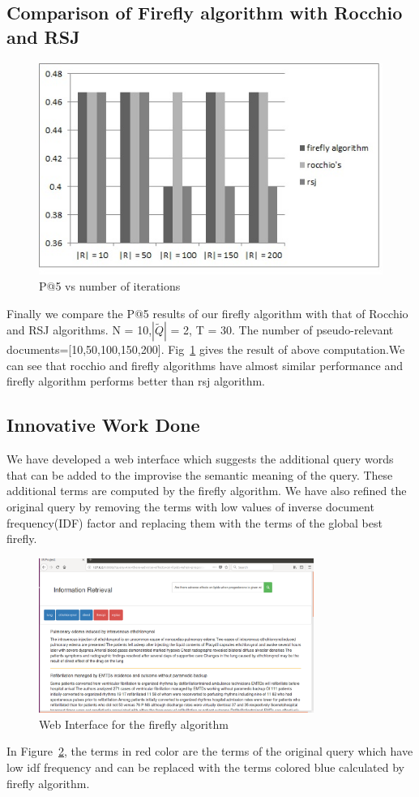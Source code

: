 \documentclass{nitk}
\begin{document}
\subsection{Comparison of Firefly algorithm with Rocchio and RSJ}
\begin{figure}[!htb]
\centering
 \includegraphics[scale=0.5]{firefly_vs_other}
 \caption{P@5 vs number of iterations}
 \label{fig:frvsoth}
 \end{figure}
Finally we compare the P@5 results of our firefly algorithm with that of Rocchio and RSJ algorithms. N = 10,$|\tilde{Q}|$ = 2, T = 30. The number of pseudo-relevant documents=[10,50,100,150,200]. Fig~\ref{fig:frvsoth} gives the result of above computation.We can see that rocchio and firefly algorithms have almost similar performance and firefly algorithm performs better than rsj algorithm.
\newpage
 \subsection{Innovative Work Done}
 We have developed a web interface which suggests the additional query words that can be added to the improvise the semantic meaning of the query. These additional terms are computed by the firefly algorithm. We have also refined the original query by removing the terms with low values of inverse document frequency(IDF) factor and replacing them with the terms of the global best firefly.
 \begin{figure}[ht]
 \centering
 \includegraphics[width=0.8\textwidth,height=0.3\textwidth]{IDF_relevancy}
 \caption{Web Interface for the firefly algorithm}
 \label{fig:web}
 \end{figure}
 In Figure~\ref{fig:web}, the terms in red color are the terms of the original query which have low idf frequency and can be replaced with the terms colored blue calculated by firefly algorithm. 
\end{document}
